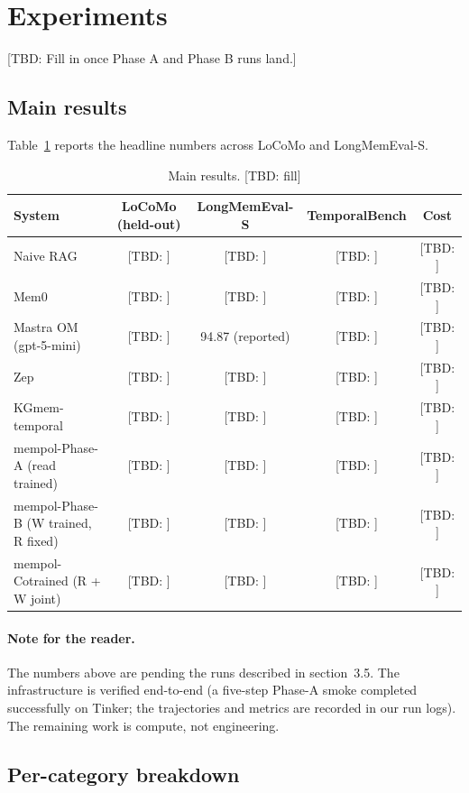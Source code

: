 \documentclass[11pt]{article}
\newcommand{\TBD}[1]{%
  \textcolor{red!80!black}{\textsf{[TBD: #1]}}}
\begin{document}
\section{Experiments}
\label{sec:experiments}

\TBD{Fill in once Phase A and Phase B runs land.}

\subsection{Main results}
\label{sec:exp-main}

Table~\ref{tab:main} reports the headline numbers across LoCoMo and
LongMemEval-S.

\begin{table}[h]
\centering
\caption{Main results. \TBD{fill}}
\label{tab:main}
\begin{tabular}{lcccc}
\toprule
System & LoCoMo (held-out) & LongMemEval-S & TemporalBench & Cost \\
\midrule
Naive RAG               & \TBD{} & \TBD{} & \TBD{} & \TBD{} \\
Mem0                    & \TBD{} & \TBD{} & \TBD{} & \TBD{} \\
Mastra OM (gpt-5-mini)  & \TBD{} & 94.87 (reported) & \TBD{} & \TBD{} \\
Zep                     & \TBD{} & \TBD{} & \TBD{} & \TBD{} \\
KGmem-temporal          & \TBD{} & \TBD{} & \TBD{} & \TBD{} \\
\midrule
\textsf{mempol-Phase-A} (read trained) & \TBD{} & \TBD{} & \TBD{} & \TBD{} \\
\textsf{mempol-Phase-B} (W trained, R fixed) & \TBD{} & \TBD{} & \TBD{} & \TBD{} \\
\textsf{mempol-Cotrained} (R + W joint)  & \TBD{} & \TBD{} & \TBD{} & \TBD{} \\
\bottomrule
\end{tabular}
\end{table}

\paragraph{Note for the reader.} The numbers above are pending the runs
described in section~3.5. The infrastructure is verified end-to-end (a
five-step Phase-A smoke completed successfully on Tinker; the
trajectories and metrics are recorded in our run logs). The remaining
work is compute, not engineering.

\subsection{Per-category breakdown}
\end{document}

